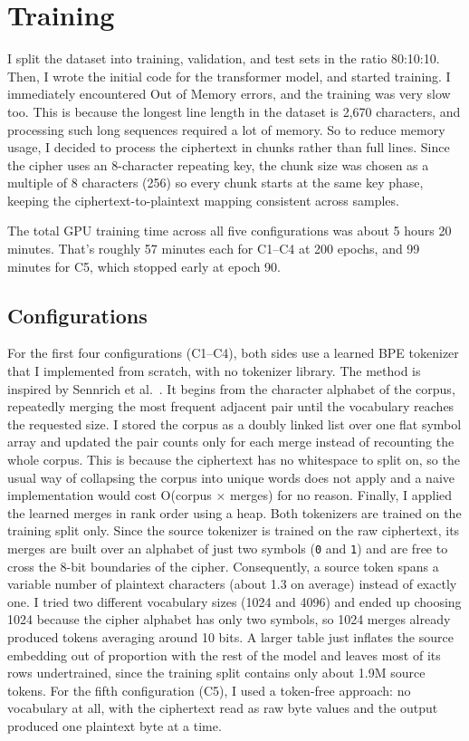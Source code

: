 \documentclass[12pt]{article}
\begin{document}
\section{Training}

I split the dataset into training, validation, and test sets in the ratio
80:10:10. Then, I wrote the initial code for the transformer model, and started
training. I immediately encountered Out of Memory errors, and the training was
very slow too. This is because the longest line length in the dataset is 2,670
characters, and processing such long sequences required a lot of memory. So to
reduce memory usage, I decided to process the ciphertext in chunks rather than
full lines. Since the cipher uses an 8-character repeating key, the chunk size
was chosen as a multiple of 8 characters (256) so every chunk starts at the same
key phase, keeping the ciphertext-to-plaintext mapping consistent across
samples.

The total GPU training time across all five configurations was about 5 hours 20
minutes. That's roughly 57 minutes each for C1--C4 at 200 epochs, and 99 minutes
for C5, which stopped early at epoch 90.

\subsection{Configurations}

For the first four configurations (C1--C4), both sides use a learned BPE
tokenizer that I implemented from scratch, with no tokenizer library. 
The method is inspired by Sennrich et al.~\cite{sennrich2016bpe}. 
It begins from the character alphabet of the corpus,
repeatedly merging the most frequent adjacent pair until the vocabulary reaches
the requested size. I stored the corpus as a doubly linked list over one flat
symbol array and updated the pair counts only for each merge instead of
recounting the whole corpus. This is because the ciphertext has no whitespace to split
on, so the usual way of collapsing the corpus into unique words does not
apply and a naive implementation would cost O(corpus $\times$ merges) for no reason. 
Finally, I applied the learned merges in rank order using a heap. Both tokenizers are
trained on the training split only. Since the source tokenizer is
trained on the raw ciphertext, its merges are built over an alphabet of just
two symbols (\texttt{0} and \texttt{1}) and are free to cross the 8-bit
boundaries of the cipher. Consequently, a source token spans a variable number of
plaintext characters (about 1.3 on average) instead of exactly one. 
I tried two different vocabulary sizes (1024 and 4096) and ended up choosing 1024 
because the cipher alphabet has only two symbols, so 1024 merges already produced tokens averaging around 10 bits. 
A larger table just inflates the source embedding out of proportion with the rest of the model
and leaves most of its rows undertrained, since the training split contains only
about 1.9M source tokens. For the fifth configuration (C5), I used a token-free
approach: no vocabulary at all, with the ciphertext read as raw byte values and
the output produced one plaintext byte at a time.
\end{document}
